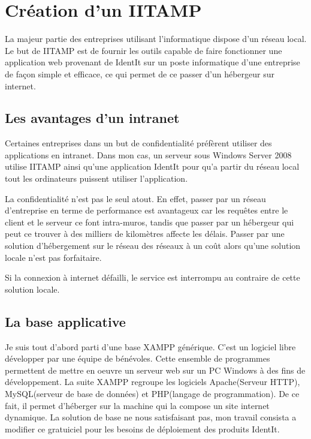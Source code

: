 \chapter{Création d'un IITAMP} %
\label{cha:Création d'un IITAMP}

\begin{it}
  La majeur partie des entreprises utilisant l'informatique
  dispose d'un réseau local. Le but de IITAMP est de fournir les outils
  capable de faire fonctionner une application web provenant de IdentIt
  sur un poste informatique d'une entreprise de façon simple et
  efficace, ce qui permet de ce passer d'un hébergeur sur internet.
\end{it}

\section{Les avantages d'un intranet} %
\label{sec:Les avantages d'un intranet}

Certaines entreprises dans un but de confidentialité préfèrent
utiliser des applications en intranet. Dans mon cas, un serveur sous
Windows Server 2008 utilise IITAMP ainsi qu'une application IdentIt pour
qu'a partir du réseau local tout les ordinateurs puissent utiliser
l'application.

La confidentialité n'est pas le seul atout. En effet, passer par un
réseau d'entreprise en terme de performance est avantageux car les
requêtes entre le client et le serveur ce font intra-muros, tandis que
passer par un hébergeur qui peut ce trouver à des milliers de kilomètres
affecte les délais. Passer par une solution d'hébergement sur le réseau
des réseaux à un coût alors qu'une solution locale n'est pas
forfaitaire.

Si la connexion à internet défailli, le service est interrompu au
contraire de cette solution locale.

\section{La base applicative} %
\label{sec:La base applicative}

Je suis tout d'abord parti d'une base XAMPP générique. C'est un logiciel
libre développer par une équipe de bénévoles. Cette ensemble de
programmes permettent de mettre en oeuvre un serveur web sur un PC
Windows à des fins de développement. La suite XAMPP regroupe les
logiciels Apache(Serveur HTTP), MySQL(serveur de base de données) et
PHP(langage de programmation). De ce fait, il permet d'héberger sur la
machine qui la compose un site internet dynamique. La solution de base
ne nous satisfaisant pas, mon travail consista a modifier ce gratuiciel
pour les besoins de déploiement des produits IdentIt.

